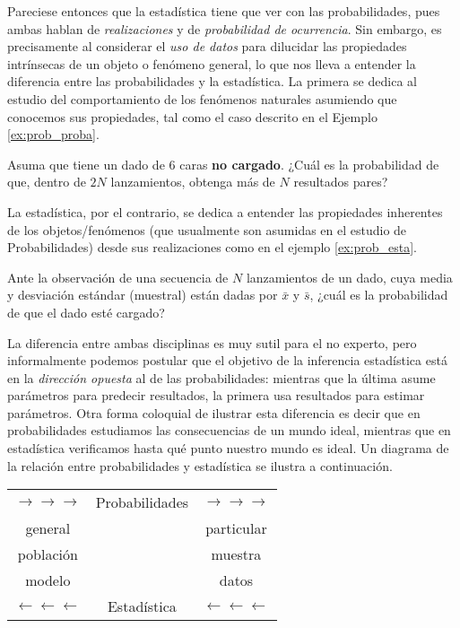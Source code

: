 Pareciese entonces que la estadística tiene que ver con las probabilidades, pues ambas hablan de \emph{realizaciones} y de \emph{probabilidad de ocurrencia}. Sin embargo, es precisamente al considerar el \emph{uso de datos} para dilucidar las propiedades intrínsecas de un objeto o fenómeno general, lo que nos lleva a entender la diferencia entre las probabilidades y la estadística. La primera se dedica al estudio del comportamiento de los fenómenos naturales asumiendo que conocemos sus propiedades, tal como el caso descrito en el Ejemplo \ref{ex:prob_proba}.
\begin{example}
\label{ex:prob_proba}
Asuma que tiene un dado de 6 caras \textbf{no cargado}. ¿Cuál es la probabilidad de que, dentro de $2N$ lanzamientos, obtenga más de $N$ resultados pares?
\end{example}

La estadística, por el contrario, se dedica a entender las propiedades inherentes de los objetos/fenómenos (que usualmente son asumidas en el estudio de Probabilidades) desde sus realizaciones como en el ejemplo \ref{ex:prob_esta}.
\begin{example} 
\label{ex:prob_esta}
Ante la observación de una secuencia de $N$ lanzamientos de un dado, cuya media y desviación estándar (muestral) están dadas por $\bar{x}$ y $\bar{s}$, ¿cuál es la probabilidad de que el dado esté cargado?
\end{example}

La diferencia entre ambas disciplinas es muy sutil para el no experto, pero informalmente podemos postular que el objetivo de la inferencia estadística está en la \emph{dirección opuesta} al de las probabilidades: mientras que la última asume parámetros para predecir resultados, la primera usa resultados para estimar parámetros. Otra forma coloquial de ilustrar esta diferencia es decir que en probabilidades estudiamos las consecuencias de un mundo ideal, mientras que en estadística verificamos hasta qué punto nuestro mundo es ideal. Un diagrama de la relación entre probabilidades y estadística se ilustra a continuación. 

\begin{table}[H]
\centering
\begin{tabular}{ccc}
$\rightarrow\rightarrow\rightarrow$ & Probabilidades & $\rightarrow\rightarrow\rightarrow$ \\
general       &                & particular    \\
población     &                & muestra       \\
modelo        &                & datos         \\
$\leftarrow\leftarrow\leftarrow$  & Estadística    & $\leftarrow\leftarrow\leftarrow$ 
\end{tabular}
\end{table}

